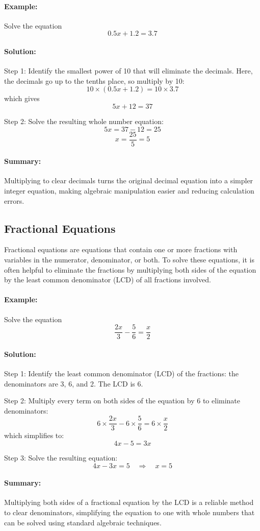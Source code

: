 \documentclass[11pt]{article}
\begin{document}
\paragraph{Example:} Solve the equation
\[
0.5x + 1.2 = 3.7
\]

\paragraph{Solution:}
Step 1: Identify the smallest power of 10 that will eliminate the decimals. Here, the decimals go up to the tenths place, so multiply by 10:
\[
10 \times (0.5x + 1.2) = 10 \times 3.7
\]
which gives
\[
5x + 12 = 37
\]

Step 2: Solve the resulting whole number equation:
\[
5x = 37 - 12 = 25
\]
\[
x = \frac{25}{5} = 5
\]

\paragraph{Summary:} Multiplying to clear decimals turns the original decimal equation into a simpler integer equation, making algebraic manipulation easier and reducing calculation errors.

\subsection{Fractional Equations}

Fractional equations are equations that contain one or more fractions with variables in the numerator, denominator, or both. To solve these equations, it is often helpful to eliminate the fractions by multiplying both sides of the equation by the least common denominator (LCD) of all fractions involved.

\paragraph{Example:} Solve the equation
\[
\frac{2x}{3} - \frac{5}{6} = \frac{x}{2}
\]

\paragraph{Solution:}

Step 1: Identify the least common denominator (LCD) of the fractions: the denominators are 3, 6, and 2. The LCD is 6.

Step 2: Multiply every term on both sides of the equation by 6 to eliminate denominators:
\[
6 \times \frac{2x}{3} - 6 \times \frac{5}{6} = 6 \times \frac{x}{2}
\]
which simplifies to:
\[
4x - 5 = 3x
\]

Step 3: Solve the resulting equation:
\[
4x - 3x = 5 \quad \Rightarrow \quad x = 5
\]

\paragraph{Summary:} Multiplying both sides of a fractional equation by the LCD is a reliable method to clear denominators, simplifying the equation to one with whole numbers that can be solved using standard algebraic techniques.
\end{document}
